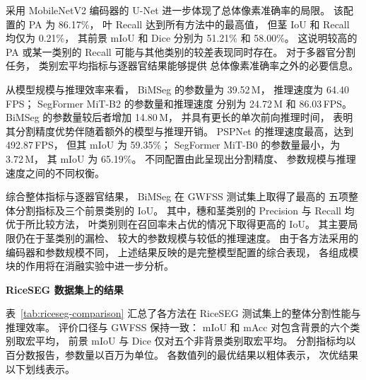 采用 MobileNetV2 编码器的 U-Net
进一步体现了总体像素准确率的局限。
该配置的 PA 为 86.17\%，
叶 Recall 达到所有方法中的最高值，
但茎 IoU 和 Recall 均仅为 0.21\%，
其前景 mIoU 和 Dice 分别为
51.21\% 和 58.00\%。
这说明较高的 PA 或某一类别的 Recall
可能与其他类别的较差表现同时存在。
对于多器官分割任务，
类别宏平均指标与逐器官结果能够提供
总体像素准确率之外的必要信息。

从模型规模与推理效率来看，
BiMSeg 的参数量为 39.52\,M，
推理速度为 64.40\,FPS；
SegFormer MiT-B2 的参数量和推理速度
分别为 24.72\,M 和 86.03\,FPS。
BiMSeg 的参数量较后者增加 14.80\,M，
并具有更长的单次前向推理时间，
表明其分割精度优势伴随着额外的模型与推理开销。
PSPNet 的推理速度最高，达到 492.87\,FPS，
但其 mIoU 为 59.35\%；
SegFormer MiT-B0 的参数量最小，为 3.72\,M，
其 mIoU 为 65.19\%。
不同配置由此呈现出分割精度、
参数规模与推理速度之间的不同权衡。

综合整体指标与逐器官结果，
BiMSeg 在 GWFSS 测试集上取得了最高的
五项整体分割指标及三个前景类别的 IoU。
其中，穗和茎类别的 Precision 与 Recall
均优于所比较方法，
叶类别则在召回率未占优的情况下取得更高的 IoU。
其主要局限仍在于茎类别的漏检、
较大的参数规模与较低的推理速度。
由于各方法采用的编码器和参数规模不同，
上述结果反映的是完整模型配置的综合表现，
各组成模块的作用将在消融实验中进一步分析。




\medskip\noindent\textbf{RiceSEG 数据集上的结果}\par
\label{sec:exp-riceseg}

表~\ref{tab:riceseg-comparison} 汇总了各方法在 RiceSEG
测试集上的整体分割性能与推理效率。
评价口径与 GWFSS 保持一致：
mIoU 和 mAcc 对包含背景的六个类别取宏平均，
前景 mIoU 与 Dice 仅对五个非背景类别取宏平均。
分割指标均以百分数报告，参数量以百万为单位。
各数值列的最优结果以粗体表示，
次优结果以下划线表示。

